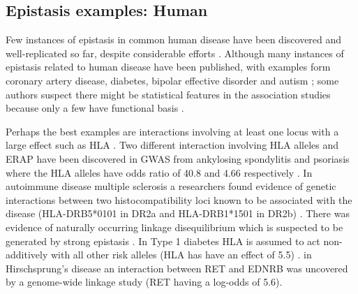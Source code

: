 

\subsection{Epistasis examples: Human}

Few instances of epistasis in common human disease have been discovered and well-replicated so far, despite considerable efforts \cite{zuk2012mystery}.
Although many instances of epistasis related to human disease have been published, with examples form coronary artery disease\cite{phillips2008epistasis:REF}, diabetes\cite{phillips2008epistasis:REF}, bipolar effective disorder\cite{phillips2008epistasis:REF} and autism \cite{phillips2008epistasis:REF}; some authors suspect there might be statistical features in the association studies because only a few have functional basis \cite{phillips2008epistasis}.

Perhaps the best examples are interactions involving at least one locus with a large effect such as HLA  \cite{zuk2012mystery}.
Two different interaction involving HLA alleles and ERAP have been discovered in GWAS from ankylosing spondylitis and psoriasis where the HLA alleles have odds ratio of 40.8 and 4.66 respectively \cite{zuk2012mystery:REF}.
In autoimmune disease multiple sclerosis a researchers found evidence of genetic interactions between two histocompatibility loci known to be associated with the disease (HLA-DRB5*0101 in DR2a and HLA-DRB1*1501 in DR2b) \cite{phillips2008epistasis:REF}. 
There was evidence of naturally occurring linkage disequilibrium which is suspected to be generated by strong epistasis \cite{phillips2008epistasis}.
In Type 1 diabetes HLA is assumed to act non-additively with all other risk alleles (HLA has have an effect of 5.5) \cite{zuk2012mystery:REF}.
in Hirschsprung's disease an interaction between RET and EDNRB was uncovered by a genome-wide linkage study (RET having a log-odds of 5.6). \cite{zuk2012mystery:REF}

